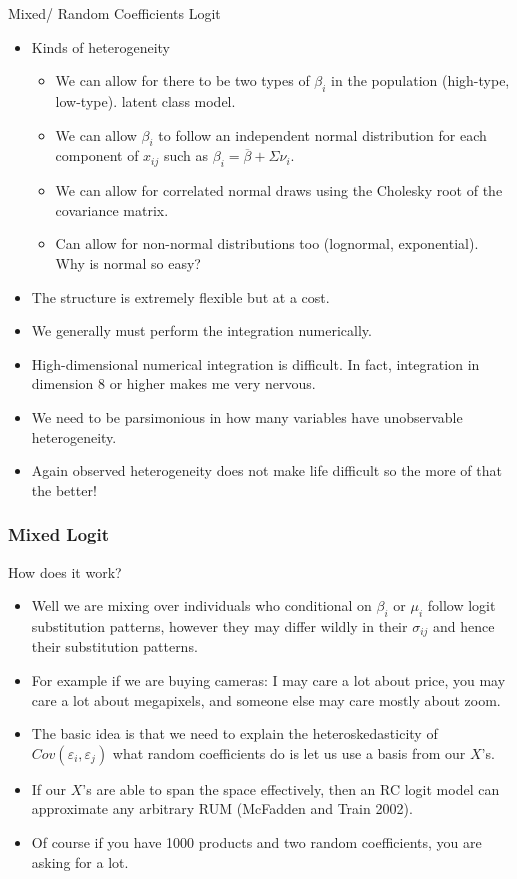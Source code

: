 \documentclass[aspectratio=169,11pt]{beamer}
\begin{document}
\begin{frame}{Mixed/ Random Coefficients Logit}
\begin{itemize}
\item Kinds of heterogeneity
\begin{itemize}
\item We can allow for there to be two types of $\beta_i$ in the population (high-type, low-type). \alert{latent class model}.
\item We can allow $\beta_i$ to follow an independent normal distribution for each component of $x_{ij}$ such as $\beta_i = \overline{\beta} + \Sigma \nu_i$.
\item We can allow for correlated normal draws using the Cholesky root of the covariance matrix.
\item Can allow for non-normal distributions too (lognormal, exponential). Why is normal so easy?
\end{itemize}
\item The structure is extremely flexible but at a cost.
\item We generally must perform the integration numerically.
\item High-dimensional numerical integration is difficult. In fact, integration in dimension 8 or higher makes me very nervous.
\item We need to be parsimonious in how many variables have unobservable heterogeneity.
\item Again observed heterogeneity does not make life difficult so the more of that the better!
\end{itemize}
\end{frame}

\begin{frame}
\frametitle{Mixed Logit}
How does it work?
 \begin{itemize}
\item Well we are mixing over individuals who conditional on $\beta_i$ or $\mu_i$ follow logit substitution patterns, however they may differ wildly in their $\sigma_{ij}$ and hence their substitution patterns.
\item For example if we are buying cameras: I may care a lot about price, you may care a lot about megapixels, and someone else may care mostly about zoom.
\item The basic idea is that we need to explain the heteroskedasticity of $Cov(\varepsilon_i, \varepsilon_j)$ what random coefficients do is let us use a basis from our $X$'s.
\item If our $X$'s are able to span the space effectively, then an RC logit model can approximate any arbitrary RUM (McFadden and Train 2002). 
\item Of course if you have 1000 products and two random coefficients, you are asking for a lot.
 \end{itemize}
\end{frame}
\end{document}
